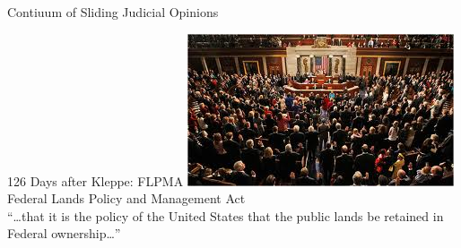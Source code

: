 {\begin{frame}[t]{Contiuum of Sliding Judicial Opinions}
\end{frame}
}%



\begin{frame}{126 Days after Kleppe: FLPMA}
    \centering
    \includegraphics[width=.8\textwidth]{img/congress.png} \\
    Federal Lands Policy and Management Act \\
    { \large ``\ldots that it is the policy of the United States that the
    public lands be retained in Federal ownership\ldots'' }
\end{frame}

